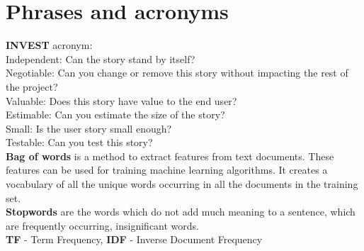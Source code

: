 \chapter{Phrases and acronyms}\label{app:B}
\textbf{INVEST} acronym:\\
Independent: Can the story stand by itself?\\
Negotiable: Can you change or remove this story without impacting
the rest of the project?\\
Valuable: Does this story have value to the end user?\\
Estimable: Can you estimate the size of the story?\\
Small: Is the user story small enough?\\
Testable: Can you test this story?\\
\hypertarget{thebag}{\textbf{Bag of words}} is a method to extract features from text documents. These features can be used for training machine learning algorithms. It creates a vocabulary of all the unique words occurring in all the documents in the training set.\\
\hypertarget{stopwords}{\textbf{Stopwords} are the words which do not add much meaning to a sentence, which are frequently occurring, insignificant words.}\\
\hypertarget{tfidf}{\textbf{TF} - Term Frequency, \textbf{IDF} - Inverse Document Frequency}
